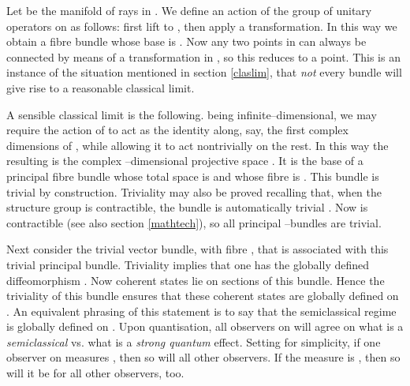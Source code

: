\documentclass[a4paper,a4paper]{article}
\begin{document}
Let \coordHE{} be the manifold of rays in \coordHE{}.
We define an action of the group of unitary operators \coordHE{}
on \coordHE{} as follows: first lift \coordHE{} to \coordHE{}, 
then apply a \coordHE{} transformation. In this way 
we obtain a fibre bundle whose base is \coordHE{}.
Now any two points in \coordHE{} can always be connected by means of a 
transformation in \coordHE{}, so this \coordHE{} reduces to a point. 
This is an instance of the situation mentioned in section \ref{claslim}, 
that {\it not} every bundle will give rise to a reasonable classical limit.

A sensible classical limit is the following. \coordHE{} being infinite--dimensional, 
we may require the action of \coordHE{} to act as the identity along, say, the 
first \coordHE{} complex dimensions of \coordHE{}, while allowing it to act nontrivially on 
the rest. In this way the resulting \coordHE{} is the complex 
\coordHE{}--dimensional projective space \coordHE{}. It is the base of a 
principal fibre bundle whose total space is \coordHE{} and whose fibre is \coordHE{}.
This bundle is trivial by construction. Triviality may also be proved 
recalling that, when the structure group is contractible, the bundle is 
automatically trivial \cite{STEENROD}. Now \coordHE{} is contractible \cite{KUIPER} 
(see also section \ref{mathtech}), so all principal \coordHE{}--bundles 
are trivial.

Next consider the trivial vector bundle, with fibre \coordHE{},
that is associated with this trivial principal bundle. Triviality 
implies that one has the globally defined diffeomorphism 
\coordHE{}.
Now coherent states lie on sections of this bundle.  
Hence the triviality of this bundle ensures that these coherent states 
are globally defined on \coordHE{}. An equivalent phrasing of this statement 
is to say that the semiclassical regime is globally defined on \coordHE{}. 
Upon quantisation, all observers on \coordHE{} will agree on 
what is a {\it semiclassical} vs. what is a {\it strong quantum} effect. 
Setting \coordHE{} for simplicity, if one observer on \coordHE{} measures 
\coordHE{}, then so will all other observers. If the measure 
is \coordHE{}, then so will it be for all other observers, too.
\end{document}
